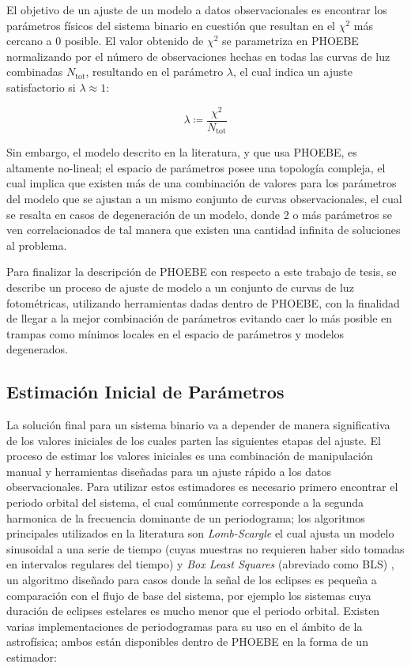 El objetivo de un ajuste de un modelo a datos observacionales es encontrar los
parámetros físicos del sistema binario en cuestión que resultan en el $\chi^{2}$
más cercano a 0 posible. El valor obtenido de $\chi^2$ se parametriza en PHOEBE
normalizando por el número de observaciones hechas en todas las curvas de luz
combinadas $N_{\mathrm{tot}}$, resultando en el parámetro $\lambda$, el cual
indica un ajuste satisfactorio si $\lambda \approx 1$:

\begin{eqfloat}
	\centering
	\begin{equation}
		\lambda \coloneq \frac{\chi^2}{N_{\textrm{tot}}}
	\end{equation}
\end{eqfloat}

Sin embargo, el modelo descrito en la literatura, y que
usa PHOEBE, es altamente no-lineal; el espacio de parámetros posee una topología
compleja, el cual implica que existen más de una combinación de valores para los
parámetros del modelo que se ajustan a un mismo conjunto de curvas
observacionales, el cual se resalta en casos de degeneración de un modelo, donde
2 o más parámetros se ven correlacionados de tal manera que existen una cantidad
infinita de soluciones al problema. 

Para finalizar la descripción de PHOEBE con
respecto a este trabajo de tesis, se describe un proceso de ajuste de modelo a
un conjunto de curvas de luz fotométricas, utilizando herramientas dadas dentro
de PHOEBE, con la finalidad de llegar a la mejor combinación de parámetros
evitando caer lo más posible en trampas como mínimos locales en el espacio de
parámetros y modelos degenerados.

\subsection{Estimación Inicial de Parámetros}

La solución final para un sistema binario va a depender de manera significativa
de los valores iniciales de los cuales parten las siguientes etapas del
ajuste. El proceso de estimar los valores iniciales es una combinación de
manipulación manual y herramientas diseñadas para un ajuste rápido a los datos
observacionales. Para utilizar estos estimadores es necesario primero encontrar
el periodo orbital del sistema, el cual comúnmente corresponde a la segunda
harmonica de la frecuencia dominante de un periodograma; los algoritmos
principales utilizados en la literatura son \textit{Lomb-Scargle}
 el cual ajusta
un modelo sinusoidal a una serie de tiempo (cuyas muestras no requieren haber
sido tomadas en intervalos regulares del tiempo) y \textit{Box Least Squares}
(abreviado como BLS) ,
un algoritmo diseñado para casos donde la señal de los eclipses es pequeña a
comparación con el flujo de base del sistema, por ejemplo los sistemas cuya
duración de eclipses estelares es mucho menor que el periodo orbital. Existen
varias implementaciones de periodogramas para su uso en el ámbito de la
astrofísica; ambos están disponibles dentro de PHOEBE en la forma de un
estimador:

